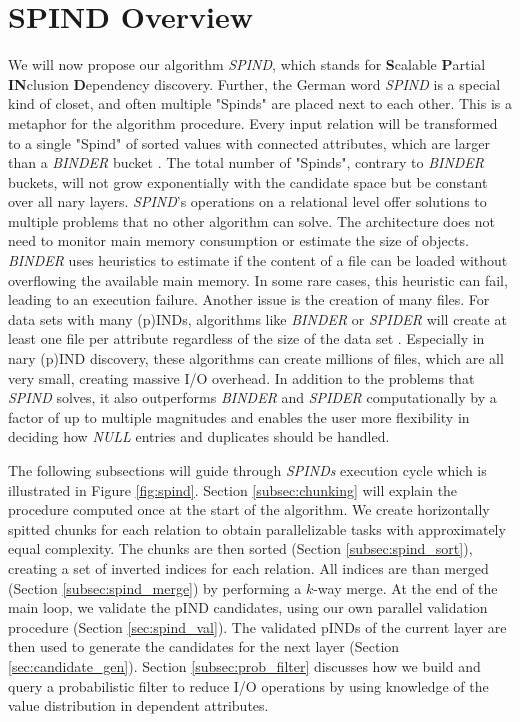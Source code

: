 \chapter{SPIND Overview}\label{sec:spind}

We will now propose our algorithm \textit{SPIND}, which stands for \textbf{S}calable \textbf{P}artial \textbf{IN}clusion \textbf{D}ependency discovery. Further, the German word \textit{SPIND} is a special kind of closet, and often multiple "Spinds" are placed next to each other. This is a metaphor for the algorithm procedure. Every input relation will be transformed to a single "Spind" of sorted values with connected attributes, which are larger than a \textit{BINDER} bucket \cite{papenbrock2015divide}.  The total number of "Spinds", contrary to \textit{BINDER} buckets, will not grow exponentially with the candidate space but be constant over all nary layers. \textit{SPIND}'s operations on a relational level offer solutions to multiple problems that no other algorithm can solve. The architecture does not need to monitor main memory consumption or estimate the size of objects. \textit{BINDER} uses heuristics to estimate if the content of a file can be loaded without overflowing the available main memory. In some rare cases, this heuristic can fail, leading to an execution failure. Another issue is the creation of many files. For data sets with many (p)INDs, algorithms like \textit{BINDER} or \textit{SPIDER} will create at least one file per attribute regardless of the size of the data set \cite{papenbrock2015divide, bauckmann2006efficiently}. Especially in nary (p)IND discovery, these algorithms can create millions of files, which are all very small, creating massive I/O overhead. In addition to the problems that \textit{SPIND} solves, it also outperforms \textit{BINDER} and \textit{SPIDER} computationally by a factor of up to multiple magnitudes and enables the user more flexibility in deciding how \textit{NULL} entries and duplicates should be handled.

The following subsections will guide through \textit{SPINDs} execution cycle which is illustrated in Figure \ref{fig:spind}. Section \ref{subsec:chunking} will explain the procedure computed once at the start of the algorithm. We create horizontally spitted chunks for each relation to obtain parallelizable tasks with approximately equal complexity. The chunks are then sorted (Section \ref{subsec:spind_sort}), creating a set of inverted indices for each relation. All indices are than merged (Section \ref{subsec:spind_merge}) by performing a $k$-way merge. At the end of the main loop, we validate the pIND candidates, using our own parallel validation procedure (Section \ref{sec:spind_val}). The validated pINDs of the current layer are then used to generate the candidates for the next layer (Section \ref{sec:candidate_gen}). Section \ref{subsec:prob_filter} discusses how we build and query a probabilistic filter to reduce I/O operations by using knowledge of the value distribution in dependent attributes.

